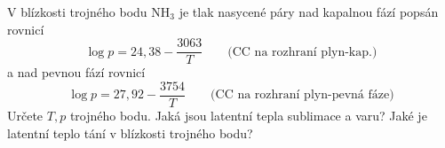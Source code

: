 \begin{priklad}[Příklad 4$^*$]
V blízkosti trojného bodu NH$_3$ je tlak nasycené páry nad kapalnou fází popsán rovnicí
\[
  \log p = 24{,}38 - \frac{3063}{T} \qquad \text{(CC na rozhraní plyn-kap.)}
\]
a nad pevnou fází rovnicí
\[
  \log p = 27{,}92 - \frac{3754}{T} \qquad \text{(CC na rozhraní plyn-pevná fáze)}
\]
Určete $T, p$ trojného bodu. Jaká jsou latentní tepla sublimace a varu? Jaké je latentní teplo tání v blízkosti trojného bodu?
\end{priklad}
